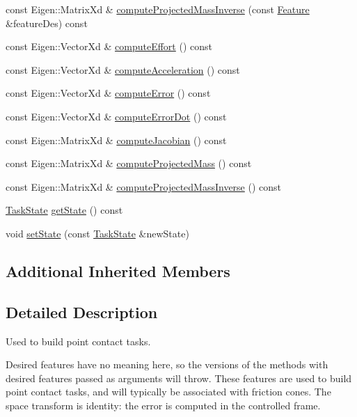 \begin{DoxyCompactItemize}
\item 
const Eigen\+::\+Matrix\+Xd \& \hyperlink{classocra_1_1PointContactFeature_a914ebdd529e25c61231945a661ffce49}{compute\+Projected\+Mass\+Inverse} (const \hyperlink{classocra_1_1Feature}{Feature} \&feature\+Des) const 
\item 
const Eigen\+::\+Vector\+Xd \& \hyperlink{classocra_1_1PointContactFeature_a41f9ac4194a62292c7c0de558b0b7c37}{compute\+Effort} () const 
\item 
const Eigen\+::\+Vector\+Xd \& \hyperlink{classocra_1_1PointContactFeature_ad4eb8d5e2e0bc3e13706e44a63fed660}{compute\+Acceleration} () const 
\item 
const Eigen\+::\+Vector\+Xd \& \hyperlink{classocra_1_1PointContactFeature_ad3a2592bdf4e389833bc2908a124bbdc}{compute\+Error} () const 
\item 
const Eigen\+::\+Vector\+Xd \& \hyperlink{classocra_1_1PointContactFeature_a97c459cea035be5d5a7074e7eb2fe8e1}{compute\+Error\+Dot} () const 
\item 
const Eigen\+::\+Matrix\+Xd \& \hyperlink{classocra_1_1PointContactFeature_af7ed0f148b98b5b79e0838bfebb642e5}{compute\+Jacobian} () const 
\item 
const Eigen\+::\+Matrix\+Xd \& \hyperlink{classocra_1_1PointContactFeature_a60548eda65965aac24a99a338d1b6ce6}{compute\+Projected\+Mass} () const 
\item 
const Eigen\+::\+Matrix\+Xd \& \hyperlink{classocra_1_1PointContactFeature_af9566553ecb06dd67bc92572aac1d4b1}{compute\+Projected\+Mass\+Inverse} () const 
\item 
\hyperlink{classocra_1_1TaskState}{Task\+State} \hyperlink{classocra_1_1PointContactFeature_a6ef6855f80774822a987de885121b1df}{get\+State} () const 
\item 
void \hyperlink{classocra_1_1PointContactFeature_ae51b5ff581c698fd63048fbbd964c567}{set\+State} (const \hyperlink{classocra_1_1TaskState}{Task\+State} \&new\+State)
\end{DoxyCompactItemize}
\subsection*{Additional Inherited Members}


\subsection{Detailed Description}
Used to build point contact tasks. 

Desired features have no meaning here, so the versions of the methods with desired features passed as arguments will throw. These features are used to build point contact tasks, and will typically be associated with friction cones. The space transform is identity\+: the error is computed in the controlled frame. 

